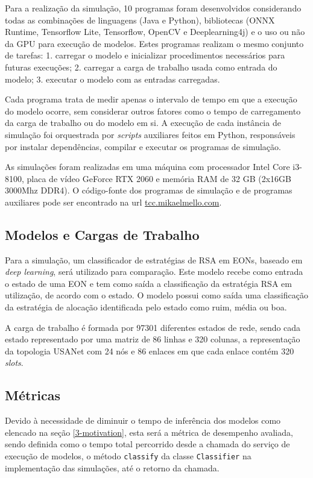 Para a realização da simulação, 10 programas foram desenvolvidos considerando todas as combinações de linguagens (Java e Python), bibliotecas (ONNX Runtime, Tensorflow Lite, Tensorflow, OpenCV e Deeplearning4j) e o uso ou não da GPU para execução de modelos. Estes programas realizam o mesmo conjunto de tarefas: 1. carregar o modelo e inicializar procedimentos necessários para futuras execuções; 2. carregar a carga de trabalho usada como entrada do modelo; 3. executar o modelo com as entradas carregadas.

Cada programa trata de medir apenas o intervalo de tempo em que a execução do modelo ocorre, sem considerar outros fatores como o tempo de carregamento da carga de trabalho ou do modelo em si. A execução de cada instância de simulação foi orquestrada por \textit{scripts} auxiliares feitos em Python, responsáveis por instalar dependências, compilar e executar os programas de simulação.

As simulações foram realizadas em uma máquina com processador Intel Core i3-8100, placa de vídeo GeForce RTX 2060 e memória RAM de 32 GB (2x16GB 3000Mhz DDR4). O código-fonte dos programas de simulação e de programas auxiliares pode ser encontrado na url \url{tcc.mikaelmello.com}.

\subsection{Modelos e Cargas de Trabalho}

Para a simulação, um classificador de estratégias de RSA em EONs, baseado em \textit{deep learning}, será utilizado para comparação. Este modelo recebe como entrada o estado de uma EON e tem como saída a classificação da estratégia RSA em utilização, de acordo com o estado. O modelo possui como saída uma classificação da estratégia de alocação identificada pelo estado como ruim, média ou boa.

A carga de trabalho é formada por 97301 diferentes estados de rede, sendo cada estado representado por uma matriz de 86 linhas e 320 colunas, a representação da topologia USANet com 24 nós e 86 enlaces em que cada enlace contém 320 \textit{slots}.

\subsection{Métricas}

Devido à necessidade de diminuir o tempo de inferência dos modelos como elencado na seção \ref{3-motivation}, esta será a métrica de desempenho avaliada, sendo definida como o tempo total percorrido desde a chamada do serviço de execução de modelos, o método \texttt{classify} da classe \texttt{Classifier} na implementação das simulações, até o retorno da chamada.

